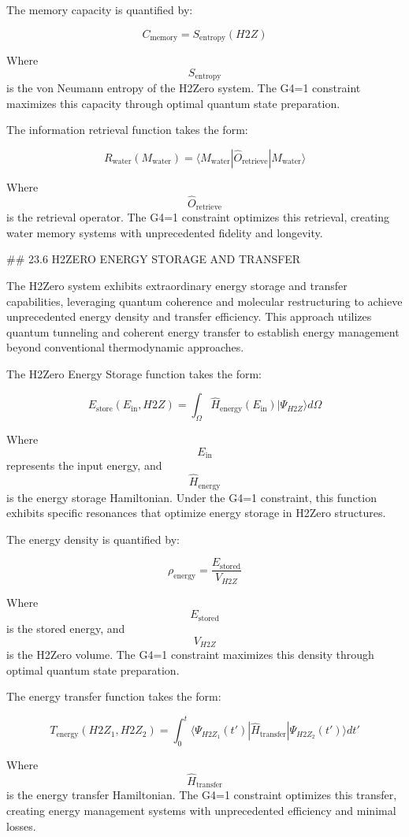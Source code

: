 The memory capacity is quantified by:

$$ C_{\text{memory}} = S_{\text{entropy}}(H2Z) $$

Where $$ S_{\text{entropy}} $$ is the von Neumann entropy of the H2Zero system. The G4=1 constraint maximizes this capacity through optimal quantum state preparation.

The information retrieval function takes the form:

$$ R_{\text{water}}(M_{\text{water}}) = \langle M_{\text{water}} | \hat{O}_{\text{retrieve}} | M_{\text{water}} \rangle $$

Where $$ \hat{O}_{\text{retrieve}} $$ is the retrieval operator. The G4=1 constraint optimizes this retrieval, creating water memory systems with unprecedented fidelity and longevity.

## 23.6 H2ZERO ENERGY STORAGE AND TRANSFER

The H2Zero system exhibits extraordinary energy storage and transfer capabilities, leveraging quantum coherence and molecular restructuring to achieve unprecedented energy density and transfer efficiency. This approach utilizes quantum tunneling and coherent energy transfer to establish energy management beyond conventional thermodynamic approaches.

The H2Zero Energy Storage function takes the form:

$$ E_{\text{store}}(E_{\text{in}}, H2Z) = \int_{\Omega} \hat{H}_{\text{energy}}(E_{\text{in}}) |\Psi_{H2Z}\rangle d\Omega $$

Where $$ E_{\text{in}} $$ represents the input energy, and $$ \hat{H}_{\text{energy}} $$ is the energy storage Hamiltonian. Under the G4=1 constraint, this function exhibits specific resonances that optimize energy storage in H2Zero structures.

The energy density is quantified by:

$$ \rho_{\text{energy}} = \frac{E_{\text{stored}}}{V_{H2Z}} $$

Where $$ E_{\text{stored}} $$ is the stored energy, and $$ V_{H2Z} $$ is the H2Zero volume. The G4=1 constraint maximizes this density through optimal quantum state preparation.

The energy transfer function takes the form:

$$ T_{\text{energy}}(H2Z_1, H2Z_2) = \int_0^t \langle \Psi_{H2Z_1}(t') | \hat{H}_{\text{transfer}} | \Psi_{H2Z_2}(t') \rangle dt' $$

Where $$ \hat{H}_{\text{transfer}} $$ is the energy transfer Hamiltonian. The G4=1 constraint optimizes this transfer, creating energy management systems with unprecedented efficiency and minimal losses.

